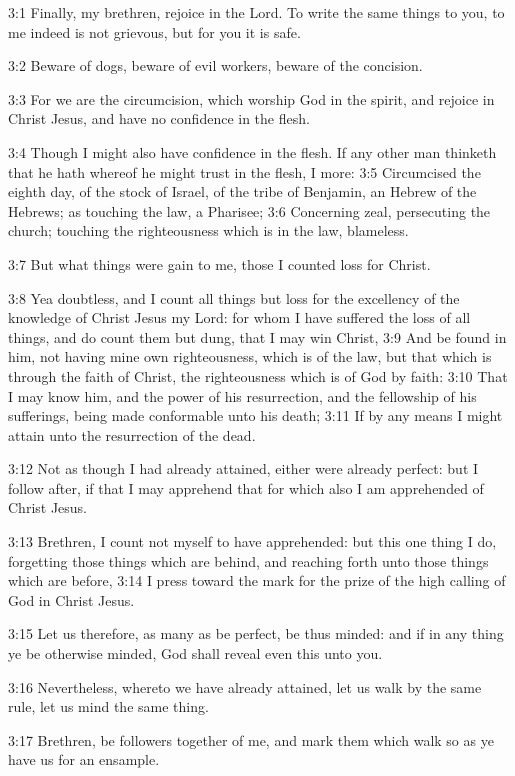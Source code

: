 3:1 Finally, my brethren, rejoice in the Lord. To write the same things to you, to me indeed is not grievous, but for you it is safe.

3:2 Beware of dogs, beware of evil workers, beware of the concision.

3:3 For we are the circumcision, which worship God in the spirit, and rejoice in Christ Jesus, and have no confidence in the flesh.

3:4 Though I might also have confidence in the flesh. If any other man thinketh that he hath whereof he might trust in the flesh, I more: 3:5 Circumcised the eighth day, of the stock of Israel, of the tribe of Benjamin, an Hebrew of the Hebrews; as touching the law, a Pharisee; 3:6 Concerning zeal, persecuting the church; touching the righteousness which is in the law, blameless.

3:7 But what things were gain to me, those I counted loss for Christ.

3:8 Yea doubtless, and I count all things but loss for the excellency of the knowledge of Christ Jesus my Lord: for whom I have suffered the loss of all things, and do count them but dung, that I may win Christ, 3:9 And be found in him, not having mine own righteousness, which is of the law, but that which is through the faith of Christ, the righteousness which is of God by faith: 3:10 That I may know him, and the power of his resurrection, and the fellowship of his sufferings, being made conformable unto his death; 3:11 If by any means I might attain unto the resurrection of the dead.

3:12 Not as though I had already attained, either were already perfect: but I follow after, if that I may apprehend that for which also I am apprehended of Christ Jesus.

3:13 Brethren, I count not myself to have apprehended: but this one thing I do, forgetting those things which are behind, and reaching forth unto those things which are before, 3:14 I press toward the mark for the prize of the high calling of God in Christ Jesus.

3:15 Let us therefore, as many as be perfect, be thus minded: and if in any thing ye be otherwise minded, God shall reveal even this unto you.

3:16 Nevertheless, whereto we have already attained, let us walk by the same rule, let us mind the same thing.

3:17 Brethren, be followers together of me, and mark them which walk so as ye have us for an ensample.

